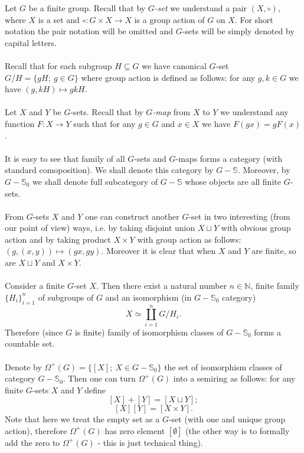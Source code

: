 \documentclass[12pt]{article}
\begin{document}
Let $G$ be a finite group. Recall that by $G$\textit{-set} we understand a pair $(X,\circ)$, where $X$ is a set and $\circ:G\times X\rightarrow X$ is a group action of $G$ on $X$. For short notation the pair notation will be omitted and $G$-sets will be simply denoted by capital letters.\\ \\
Recall that for each subgroup $H\subseteq G$ we have canonical $G$-set $G/H=\{gH;\ g\in G\}$ where group action is defined as follows: for any $g,k\in G$ we have $(g,kH)\longmapsto gkH$.\\ \\
Let $X$ and $Y$ be $G$-sets. Recall that by $G$\textit{-map} from $X$ to $Y$ we understand any function $F:X\rightarrow Y$ such that for any $g\in G$ and $x\in X$ we have $F(gx)=gF(x)$.\\ \\
It is easy to see that family of all $G$-sets and $G$-maps forms a category (with standard comoposition). We shall denote this category by $G-\mathbb{S}$. Moreover, by $G-\mathbb{S}_{0}$ we shall denote full subcategory of $G-\mathbb{S}$ whose objects are all finite $G$-sets.\\ \\
From $G$-sets $X$ and $Y$ one can construct another $G$-set in two interesting (from our point of view) ways, i.e. by taking disjoint union $X\sqcup Y$ with obvious group action and by taking product $X\times Y$ with group action as follows: $(g,(x,y))\longmapsto (gx,gy).$ Moreover it is clear that when $X$ and $Y$ are finite, so are $X\sqcup Y$ and $X\times Y$.\\ \\
Consider a finite $G$-set $X$. Then there exist a natural number $n\in\mathbb{N}$, finite family $\{H_{i}\}_{i=1}^{n}$ of subgroups of $G$ and an isomorphism (in $G-\mathbb{S}_{0}$ category) $$X\simeq\coprod_{i=1}^{n} G/H_{i}.$$
Therefore (since $G$ is finite) family of isomorphism classes of $G-\mathbb{S}_{0}$ forms a countable set.\\ \\
Denote by $\Omega^{+}(G)=\{[X];\ X\in G-\mathbb{S}_{0}\}$ the set of isomorphism classes of category $G-\mathbb{S}_{0}$. Then one can turn $\Omega^{+}(G)$ into a semiring as follows: for any finite $G$-sets $X$ and $Y$ define
$$[X]+[Y]=[X\sqcup Y];$$
$$[X][Y]=[X\times Y].$$
Note that here we treat the empty set as a $G$-set (with one and unique group action), therefore $\Omega^{+}(G)$ has zero element $[\emptyset]$ (the other way is to formally add the zero to $\Omega^{+}(G)$ - this is just technical thing).\\ \\
\end{document}
